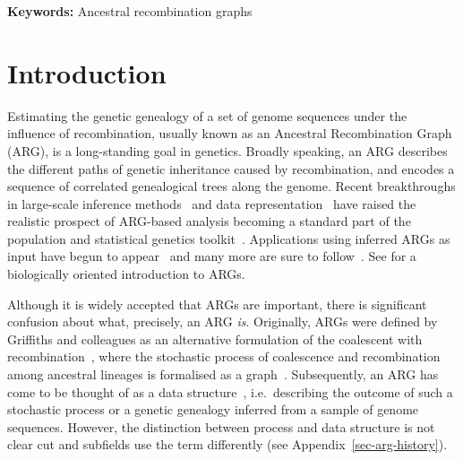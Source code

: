 \documentclass{article}
\begin{document}
\textbf{Keywords:} Ancestral recombination graphs

\linenumbers
\section{Introduction}
\label{sec-intro}
Estimating the genetic genealogy of a set of genome sequences
under the influence of recombination,
usually known as an Ancestral Recombination Graph (ARG), is a long-standing
goal in genetics.
Broadly speaking, an ARG describes the different paths of genetic inheritance
caused by recombination, and encodes a sequence of correlated genealogical
trees along the genome.
Recent breakthroughs
in large-scale inference
methods~\citep{rasmussen2014genome,kelleher2019inferring,speidel2019method,
schaefer2021ancestral,wohns2022unified,zhang2023biobank,zhan2023towards}
and data representation~\citep{kelleher2016efficient,kelleher2018efficient}
have raised the realistic prospect of ARG-based analysis becoming a standard part
of the population and statistical genetics toolkit~\citep{hejase2020summary}.
Applications using inferred ARGs as input have begun to
appear~\citep{osmond2021estimating,fan2022genealogical,hejase2022deep,zhang2023biobank,
nowbandegani2023extremely,ignatieva2023distribution}
and many more are sure to
follow~\citep{harris2019database,harris2023using}.
See \citet{lewanski2023era} for a biologically oriented introduction to ARGs.

Although it is widely accepted that ARGs are important, there is significant
confusion about what, precisely, an ARG \emph{is}.
Originally, ARGs were defined by Griffiths and colleagues as an alternative
formulation of the coalescent with recombination~\citep{hudson1983properties},
where the stochastic process of coalescence and recombination
among ancestral lineages is formalised as a
graph~\citep{griffiths1991two,ethier1990two,griffiths1996ancestral,griffiths1997ancestral}.
Subsequently, an ARG  has come to be thought of as a data
structure~\citep{minichiello2006mapping}, i.e.\ describing
the outcome of such a stochastic process or a
genetic genealogy inferred from a sample of genome sequences.
However, the distinction between process and data structure is not clear cut
and subfields use the term
differently (see Appendix~\ref{sec-arg-history}).
\end{document}
